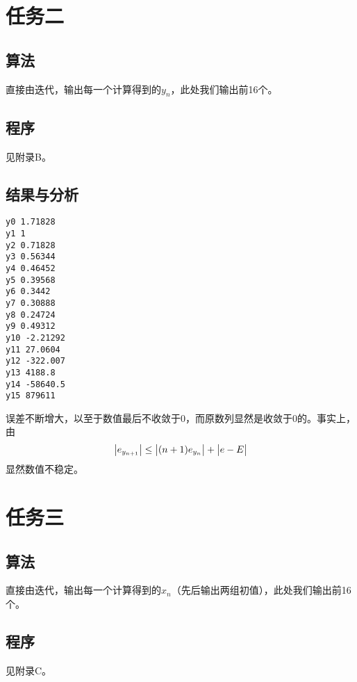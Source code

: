 \documentclass[a4paper,11pt,onecolumn,twoside]{article}
\begin{document}
\section{任务二}
\subsection{算法}
直接由迭代，输出每一个计算得到的$y_{n}$，此处我们输出前16个。
\subsection{程序}
见附录B。
\subsection{结果与分析}
\begin{lstlisting}
y0 1.71828
y1 1
y2 0.71828
y3 0.56344
y4 0.46452
y5 0.39568
y6 0.3442
y7 0.30888
y8 0.24724
y9 0.49312
y10 -2.21292
y11 27.0604
y12 -322.007
y13 4188.8
y14 -58640.5
y15 879611
\end{lstlisting}
误差不断增大，以至于数值最后不收敛于0，而原数列显然是收敛于0的。事实上，由$$\big{|} e_{y_{n+1}}\big{|} \leq \big{|}(n+1)e_{y_{n}}\big{|}+\big{|}e-E\big{|}$$显然数值不稳定。

\section{任务三}
\subsection{算法}
直接由迭代，输出每一个计算得到的$x_{n}$（先后输出两组初值），此处我们输出前16个。
\subsection{程序}
见附录C。
\end{document}
